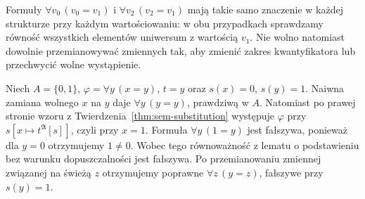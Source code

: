 \begin{przyklad}
Formuły $\forall v_0\,(v_0=v_1)$ i
$\forall v_2\,(v_2=v_1)$ mają takie samo znaczenie w każdej
strukturze przy każdym wartościowaniu: w obu przypadkach
sprawdzamy równość wszystkich elementów uniwersum z wartością $v_1$.
Nie wolno natomiast dowolnie przemianowywać zmiennych tak,
aby zmienić zakres kwantyfikatora lub przechwycić wolne wystąpienie.
\end{przyklad}

\begin{przyklad}
Niech $A=\{0,1\}$, $\varphi=\forall y\,(x=y)$,
$t=y$ oraz $s(x)=0$, $s(y)=1$. Naiwna zamiana wolnego
$x$ na $y$ daje $\forall y\,(y=y)$, prawdziwą w $A$.
Natomiast po prawej stronie wzoru z
Twierdzenia~\ref{thm:sem-substitution} występuje
$\varphi$ przy $s[x\mapsto t^{\mathfrak A}[s]]$,
czyli przy $x=1$. Formuła $\forall y\,(1=y)$ jest
fałszywa, ponieważ dla $y=0$ otrzymujemy $1\ne0$.
Wobec tego równoważność z lematu o podstawieniu bez
warunku dopuszczalności jest fałszywa. Po przemianowaniu
zmiennej związanej na świeżą $z$ otrzymujemy poprawne
$\forall z\,(y=z)$, fałszywe przy $s(y)=1$.
\end{przyklad}

